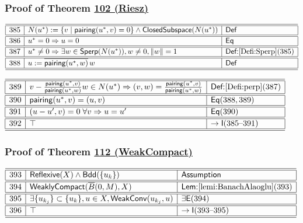 \documentclass[11pt,reqno]{amsart}
\begin{document}
\medskip

\subsubsection*{Proof of Theorem \hyperlink{thm:Riesz}{102 (\textsf{Riesz})}}

\noindent$%
\begin{array}{|r|l|l|}
\hline\hline
385 & N(u^{*}):=\{v\mid\mathsf{pairing}(u^{*},v)=0\}\wedge\mathsf{ClosedSubspace}(N(u^{*})) & \mathsf{Def} \\ \hline\hline
386 & u^{*}=0\Rightarrow u=0 & \mathsf{Eq} \\ \hline\hline
387 & u^{*}\neq0\Rightarrow\exists w\in\mathsf{Sperp}(N(u^{*})),w\neq0,\|w\|=1 & \textsf{Def:}\ref{Defi:Sperp}(385) \\ \hline\hline
388 & u:=\overline{\mathsf{pairing}(u^{*},w)}\,w & \mathsf{Def} \\ \hline\hline
\end{array}%
$

\medskip

\noindent$%
\begin{array}{|r|l|l|}
\hline\hline
389 & v-\tfrac{\mathsf{pairing}(u^{*},v)}{\mathsf{pairing}(u^{*},w)}w\in N(u^{*})\Rightarrow(v,w)=\tfrac{\mathsf{pairing}(u^{*},v)}{\mathsf{pairing}(u^{*},w)} & \textsf{Def:}\ref{Defi:perp}(387) \\ \hline\hline
390 & \mathsf{pairing}(u^{*},v)=(u,v) & \mathsf{Eq}(388,389) \\ \hline\hline
391 & (u-u^{\prime},v)=0\;\forall v\Rightarrow u=u^{\prime} & \mathsf{Eq}(390) \\ \hline\hline
392 & \top & \to\mathsf{I}(385\text{--}391) \\ \hline\hline
\end{array}%
$

\medskip

\subsubsection*{Proof of Theorem \hyperlink{thm:WeakCompact}{112 (\textsf{WeakCompact})}}

\noindent$%
\begin{array}{|r|l|l|}
\hline\hline
393 & \mathsf{Reflexive}(X)\wedge\mathsf{Bdd}(\{u_{k}\}) & \textsf{Assumption} \\ \hline\hline
394 & \mathsf{WeaklyCompact}(\overline{B}(0,M),X) & \textsf{Lem:}\ref{lemi:BanachAlaoglu}(393) \\ \hline\hline
395 & \exists\{u_{k_{j}}\}\subset\{u_{k}\},u\in X,\mathsf{WeakConv}(u_{k_{j}},u) & \exists\mathsf{E}(394) \\ \hline\hline
396 & \top & \to\mathsf{I}(393\text{--}395) \\ \hline\hline
\end{array}%
$
\end{document}
